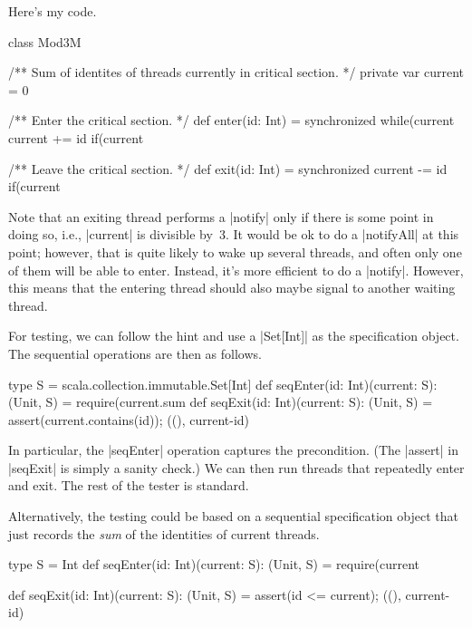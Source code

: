 \begin{answerI}
Here's my code.
%
\begin{scala}
class Mod3M{
  /** Sum of identites of threads currently in critical section. */
  private var current = 0

  /** Enter the critical section. */
  def enter(id: Int) = synchronized{
    while(current%
    current += id
    if(current%
  }

  /** Leave the critical section. */
  def exit(id: Int) = synchronized{
    current -= id
    if(current%
  }
}
\end{scala}
%
Note that an exiting thread performs a |notify| only if there is some point in
doing so, i.e., |current| is divisible by~3.  It would be ok to do a
|notifyAll| at this point; however, that is quite likely to wake up several
threads, and often only one of them will be able to enter.  Instead, it's more
efficient to do a |notify|.  However, this means that the entering thread
should also maybe signal to another waiting thread.



For testing, we can follow the hint and use a |Set[Int]| as the specification
object.  The sequential operations are then as follows.
%
\begin{scala}
  type S = scala.collection.immutable.Set[Int]
  def seqEnter(id: Int)(current: S): (Unit, S) = {
    require(current.sum%
  }
  def seqExit(id: Int)(current: S): (Unit, S) = {
    assert(current.contains(id)); ((), current-id)
  }
\end{scala}
%
In particular, the |seqEnter| operation captures the precondition.  (The
|assert| in |seqExit| is simply a sanity check.)  We can then run threads that
repeatedly enter and exit.  The rest of the tester is standard. 

Alternatively, the testing could be based on a sequential specification object
that just records the \emph{sum} of the identities of current threads.
%
\begin{scala}
  type S = Int
  def seqEnter(id: Int)(current: S): (Unit, S) = {
    require(current%
  }

  def seqExit(id: Int)(current: S): (Unit, S) = {
    assert(id <= current); ((), current-id)
  }
\end{scala}
\end{answerI}
